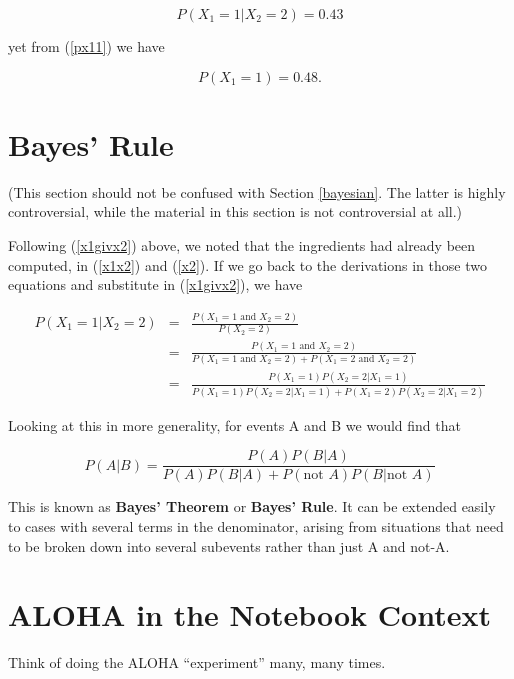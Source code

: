 \begin{equation}
P(X_1 = 1 | X_2 = 2) = 0.43
\end{equation}

yet from (\ref{px11}) we have

\begin{equation}
P(X_1 = 1) = 0.48.
\end{equation}

\section{Bayes' Rule}
\label{bayesthm}

(This section should not be confused with Section \ref{bayesian}.  The
latter is highly controversial, while the material in this section is
not controversial at all.)

Following (\ref{x1givx2}) above, we noted that the ingredients had
already been computed, in (\ref{x1x2}) and (\ref{x2}).  If we go back
to the derivations in those two equations and substitute in
(\ref{x1givx2}), we have

\begin{eqnarray}
P(X_1 = 1 | X_2 = 2) &=& 
\frac
{P(X_1 = 1 \textrm{ and } X_2 = 2)}
{P(X_2 = 2)} \\
&=& \frac
{P(X_1 = 1 \textrm{ and } X_2 = 2)}
{P(X_1 = 1 \textrm{ and } X_2 = 2) + P(X_1 = 2 \textrm{ and } X_2 = 2)} \\
&=& \frac
{P(X_1 = 1) P(X_2 = 2 | X_1 = 1)}
{P(X_1 = 1) P(X_2 = 2 | X_1 = 1) + P(X_1 = 2) P(X_2 = 2 | X_1 = 2)} 
\end{eqnarray}

Looking at this in more generality, for events A and B we would find
that

\begin{equation}
\label{thisisbayes}
P(A|B) = \frac{P(A) P(B|A)}{P(A) P(B|A) + P(\textrm{not }A)
P(B|\textrm{not } A)}
\end{equation}

This is known as {\bf Bayes' Theorem} or {\bf Bayes' Rule}.  It can be
extended easily to cases with several terms in the denominator, arising
from situations that need to be broken down into several subevents
rather than just A and not-A.

\section{ALOHA in the Notebook Context}

Think of doing the ALOHA ``experiment'' many, many times.

